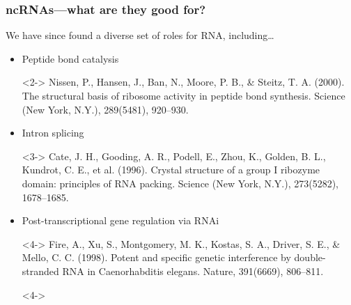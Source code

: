 \documentclass{beamer}
\begin{document}
\begin{frame}
	\frametitle{ncRNAs---what are they good for?}

	We have since found a diverse set of roles for RNA, including\dots
  \pause
	\begin{itemize}
		\item<2-> Peptide bond catalysis
		\item[]<2-> \scriptsize Nissen, P., Hansen, J., Ban, N., Moore, P. B., \& Steitz, T. A. (2000). The structural basis of ribosome activity in peptide bond synthesis. Science (New York, N.Y.), 289(5481), 920--930.


		\item<3-> Intron splicing
		\item[]<3-> \scriptsize Cate, J. H., Gooding, A. R., Podell, E., Zhou, K., Golden, B. L., Kundrot, C. E., et al. (1996). Crystal structure of a group I ribozyme domain: principles of RNA packing. Science (New York, N.Y.), 273(5282), 1678--1685.
		\item<4-> Post-transcriptional gene regulation via RNAi
		\item[]<4-> \scriptsize Fire, A., Xu, S., Montgomery, M. K., Kostas, S. A., Driver, S. E., \& Mello, C. C. (1998). Potent and specific genetic interference by double-stranded RNA in Caenorhabditis elegans. Nature, 391(6669), 806--811.
		\item[]<4->
	\end{itemize}
\end{frame}
\end{document}

